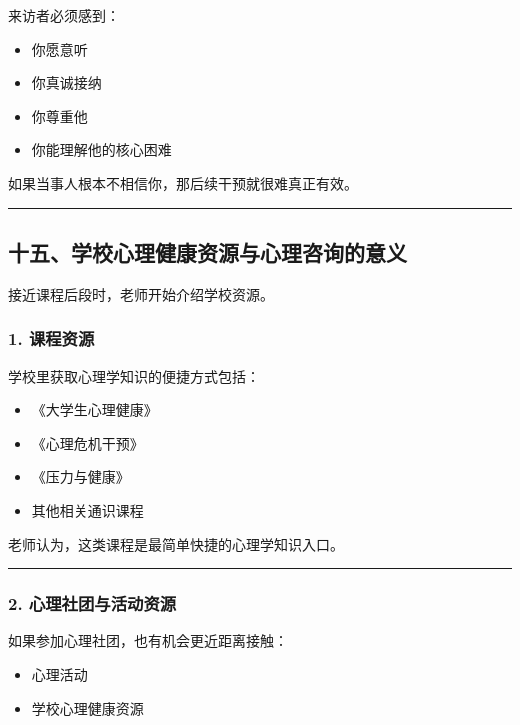 \documentclass[
  chinese,
  9pt,
  a4paper,
]{ctexart}
\providecommand{\tightlist}{%
  \setlength{\itemsep}{0pt}\setlength{\parskip}{0pt}}
\begin{document}
来访者必须感到：

\begin{itemize}
\tightlist
\item
  你愿意听
\item
  你真诚接纳
\item
  你尊重他
\item
  你能理解他的核心困难
\end{itemize}

如果当事人根本不相信你，那后续干预就很难真正有效。

\begin{center}\rule{0.5\linewidth}{0.5pt}\end{center}

\subsection{十五、学校心理健康资源与心理咨询的意义}\label{ux5341ux4e94ux5b66ux6821ux5fc3ux7406ux5065ux5eb7ux8d44ux6e90ux4e0eux5fc3ux7406ux54a8ux8be2ux7684ux610fux4e49}

接近课程后段时，老师开始介绍学校资源。

\subsubsection{1. 课程资源}\label{ux8bfeux7a0bux8d44ux6e90}

学校里获取心理学知识的便捷方式包括：

\begin{itemize}
\tightlist
\item
  《大学生心理健康》
\item
  《心理危机干预》
\item
  《压力与健康》
\item
  其他相关通识课程
\end{itemize}

老师认为，这类课程是最简单快捷的心理学知识入口。

\begin{center}\rule{0.5\linewidth}{0.5pt}\end{center}

\subsubsection{2.
心理社团与活动资源}\label{ux5fc3ux7406ux793eux56e2ux4e0eux6d3bux52a8ux8d44ux6e90}

如果参加心理社团，也有机会更近距离接触：

\begin{itemize}
\tightlist
\item
  心理活动
\item
  学校心理健康资源
\end{itemize}
\end{document}
